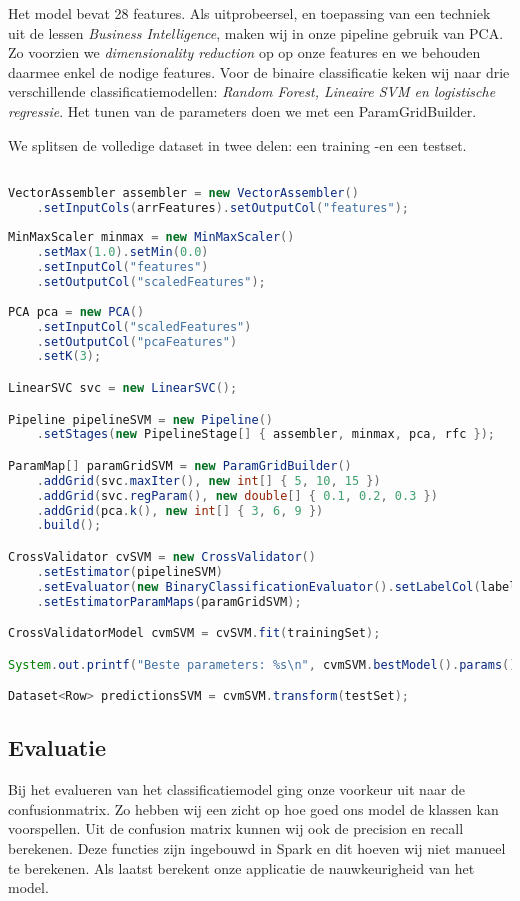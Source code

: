 \documentclass[a4paper,10pt,twoside]{report}
\begin{document}
Het model bevat 28 features. Als uitprobeersel, en toepassing van een techniek uit de lessen \textit{Business Intelligence}, maken wij in onze pipeline gebruik van PCA. Zo voorzien we \textit{dimensionality reduction} op op onze features en we behouden daarmee enkel de nodige features. Voor de binaire classificatie keken wij naar drie verschillende classificatiemodellen: \textit{Random Forest, Lineaire SVM en logistische regressie}. Het tunen van de parameters doen we met een ParamGridBuilder. 

We splitsen de volledige dataset in twee delen: een training -en een testset.

\begin{lstlisting}[language=Java]

VectorAssembler assembler = new VectorAssembler()
	.setInputCols(arrFeatures).setOutputCol("features");
	
MinMaxScaler minmax = new MinMaxScaler()
	.setMax(1.0).setMin(0.0)
	.setInputCol("features")
	.setOutputCol("scaledFeatures");
	
PCA pca = new PCA()
	.setInputCol("scaledFeatures")
	.setOutputCol("pcaFeatures")
	.setK(3);

LinearSVC svc = new LinearSVC();

Pipeline pipelineSVM = new Pipeline()
	.setStages(new PipelineStage[] { assembler, minmax, pca, rfc });

ParamMap[] paramGridSVM = new ParamGridBuilder()
	.addGrid(svc.maxIter(), new int[] { 5, 10, 15 })
	.addGrid(svc.regParam(), new double[] { 0.1, 0.2, 0.3 })
	.addGrid(pca.k(), new int[] { 3, 6, 9 })
	.build();

CrossValidator cvSVM = new CrossValidator()
	.setEstimator(pipelineSVM)
	.setEvaluator(new BinaryClassificationEvaluator().setLabelCol(label))
	.setEstimatorParamMaps(paramGridSVM);

CrossValidatorModel cvmSVM = cvSVM.fit(trainingSet);

System.out.printf("Beste parameters: %s\n", cvmSVM.bestModel().params().toString());

Dataset<Row> predictionsSVM = cvmSVM.transform(testSet);
\end{lstlisting}

\newpage

\subsection*{Evaluatie}

Bij het evalueren van het classificatiemodel ging onze voorkeur uit naar de confusionmatrix. Zo hebben wij een zicht op hoe goed ons model de klassen kan voorspellen. Uit de confusion matrix kunnen wij ook de precision en recall berekenen. Deze functies zijn ingebouwd in Spark en dit hoeven wij niet manueel te berekenen. Als laatst berekent onze applicatie de nauwkeurigheid van het model. 
\end{document}
